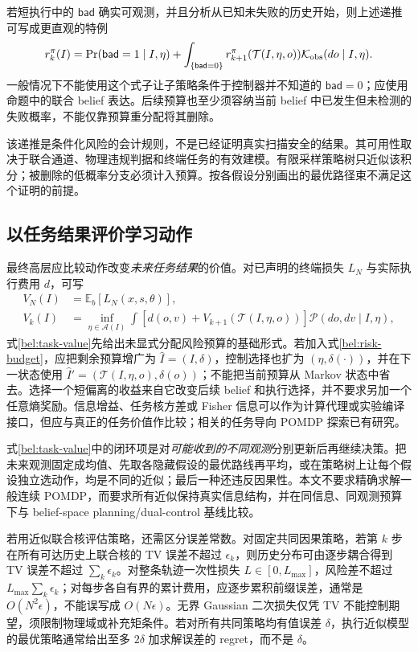 \documentclass[11pt,a4paper]{article}
\numberwithin{equation}{section}
\theoremstyle{definition}
\newcommand{\E}{\mathbb E}
\begin{document}
若短执行中的 $\mathsf{bad}$ 确实可观测，并且分析从已知未失败的历史开始，则上述递推可写成更直观的特例
\begin{equation}
 r_k^\pi(I)=\Pr(\mathsf{bad}=1\mid I,\eta)
 +\int_{\{\mathsf{bad}=0\}}r_{k+1}^\pi(\mathcal T(I,\eta,o))
 \mathcal K_{\rm obs}(do\mid I,\eta).
 \label{bel:risk-observed-failure}
\end{equation}
一般情况下不能使用这个式子让子策略条件于控制器并不知道的 $\mathsf{bad}=0$；应使用命题中的联合 belief 表达。后续预算也至少须容纳当前 belief 中已发生但未检测的失败概率，不能仅靠预算重分配将其删除。

该递推是条件化风险的会计规则，不是已经证明真实扫描安全的结果。其可用性取决于联合通道、物理违规判据和终端任务的有效建模。有限采样策略树只近似该积分；被删除的低概率分支必须计入预算。按各假设分别画出的最优路径束不满足这个证明的前提。

\subsection{以任务结果评价学习动作}
\label{bel:planning}

最终高层应比较动作改变\emph{未来任务结果}的价值。对已声明的终端损失 $L_N$ 与实际执行费用 $d$，可写
\begin{align}
 V_N(I)&=\E_{b}[L_N(x,s,\theta)],\\
 V_k(I)&=\inf_{\eta\in\mathcal A(I)}
 \int\left[d(o,v)+V_{k+1}(\mathcal T(I,\eta,o))\right]
 \mathcal P(do,dv\mid I,\eta),
 \label{bel:task-value}
\end{align}
式\eqref{bel:task-value}先给出未显式分配风险预算的基础形式。若加入式\eqref{bel:risk-budget}，应把剩余预算增广为 $\widehat I=(I,\delta)$，控制选择也扩为 $(\eta,\delta(\cdot))$，并在下一状态使用 $\widehat I'=(\mathcal T(I,\eta,o),\delta(o))$；不能把当前预算从 Markov 状态中省去。选择一个短偏离的收益来自它改变后续 belief 和执行选择，并不要求另加一个任意熵奖励。信息增益、任务核方差或 Fisher 信息可以作为计算代理或实验编译接口，但应与真正的任务价值作比较；相关的任务导向 POMDP 探索已有研究\cite{bel_curtis2023}。

式\eqref{bel:task-value}中的闭环项是对\emph{可能收到的不同观测}分别更新后再继续决策。把未来观测固定成均值、先取各隐藏假设的最优路线再平均，或在策略树上让每个假设独立选动作，均是不同的近似；最后一种还违反因果性。本文不要求精确求解一般连续 POMDP，而要求所有近似保持真实信息结构，并在同信息、同观测预算下与 belief-space planning/dual-control 基线比较。

若用近似联合核评估策略，还需区分误差常数。对固定共同因果策略，若第 $k$ 步在所有可达历史上联合核的 TV 误差不超过 $\epsilon_k$，则历史分布可由逐步耦合得到 TV 误差不超过 $\sum_k\epsilon_k$。对整条轨迹一次性损失 $L\in[0,L_{\max}]$，风险差不超过 $L_{\max}\sum_k\epsilon_k$；对每步各自有界的累计费用，应逐步累积前缀误差，通常是 $O(N^2\epsilon)$，不能误写成 $O(N\epsilon)$。无界 Gaussian 二次损失仅凭 TV 不能控制期望，须限制物理域或补充矩条件。若对所有共同策略均有值误差 $\delta$，执行近似模型的最优策略通常给出至多 $2\delta$ 加求解误差的 regret，而不是 $\delta$。
\end{document}
